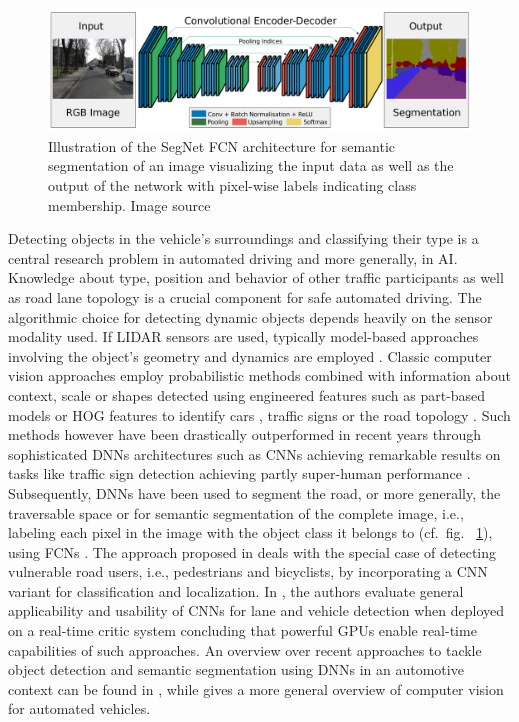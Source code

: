 \begin{figure}[t!]
    \centering
    \includegraphics[width=0.95\linewidth]{imgs/segnet.png}
    \caption{Illustration of the SegNet \ac{FCN} architecture for semantic segmentation of an image visualizing the input data as well as the output of the network with pixel-wise labels indicating class membership. Image source \cite{Badrinarayanan2015}}
    \label{fig:segnet_achitecture}
\end{figure}
Detecting objects in the vehicle's surroundings and classifying their type is a central research problem in automated driving and more generally, in \ac{AI}.
Knowledge about type, position and behavior of other traffic participants as well as road lane topology is a crucial component for safe automated driving.
The algorithmic choice for detecting dynamic objects depends heavily on the sensor modality used.
If \ac{LIDAR} sensors are used, typically model-based approaches involving the object's geometry and dynamics are employed \cite{Petrovskaya2009a, Petrovskaya2009, Darms2008}.
Classic computer vision approaches employ probabilistic methods combined with information about context, scale or shapes detected using engineered features such as part-based models or \ac{HOG} features to identify cars \cite{Held2012}, traffic signs \cite{Li2015} or the road topology \cite{Alvarez2011, Beyeler2014}.
Such methods however have been drastically outperformed in recent years through sophisticated \acp{DNN} architectures such as \acp{CNN} achieving remarkable results on tasks like traffic sign detection \cite{Ciresan2012, Sermanet2011} achieving partly super-human performance \cite{Stallkamp2012}.
Subsequently, \acp{DNN} have been used to segment the road, or more generally, the traversable space \cite{Mohan2014, Bittel2015} or for semantic segmentation of the complete image, i.e., labeling each pixel in the image with the object class it belongs to (cf.\ fig. ~\ref{fig:segnet_achitecture}), using \acp{FCN} \cite{Badrinarayanan2015, Long2015, Chen2018}.
The approach proposed in \cite{Li2017} deals with the special case of detecting vulnerable road users, i.e., pedestrians and bicyclists, by incorporating a \ac{CNN} variant for classification and localization.
In \cite{Huval2015}, the authors evaluate general applicability and usability of \acp{CNN} for lane and vehicle detection when deployed on a real-time critic system concluding that powerful \acp{GPU} enable real-time capabilities of such approaches.
An overview over recent approaches to tackle object detection and semantic segmentation using \acp{DNN} in an automotive context can be found in \cite{Feng2019}, while \cite{Janai2017} gives a more general overview of computer vision for automated vehicles.


